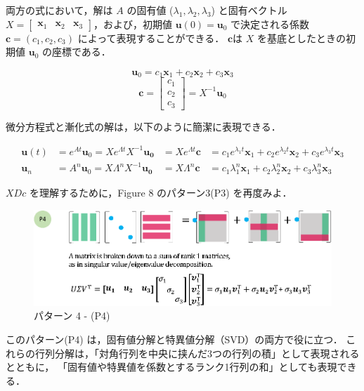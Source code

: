 \documentclass[letterpaper]{article}
\begin{document}
両方の式において，解は $A$ の固有値 ($\lambda_1, \lambda_2, \lambda_3$) と固有ベクトル
$X=\begin{bmatrix} \bm{x}_1 & \bm{x}_2 & \bm{x}_3 \end{bmatrix}$，および，初期値
$\bm{u}(0)=\bm{u}_0$ で決定される係数$\bm{c}=(c_1, c_2, c_3)$ によって表現することができる．
$\bm{c}$は $X$ を基底としたときの初期値 $\bm{u}_0$ の座標である．

\begin{equation*}
  \bm{u}_0 = c_1 \bm{x}_1 + c_2 \bm{x}_2 + c_3 \bm{x}_3
\end{equation*}
\begin{equation*}
  \bm{c} =
  \begin{bmatrix}
    c_1\\
    c_2\\
    c_3
  \end{bmatrix} = X^{-1} \bm{u}_0
\end{equation*}

微分方程式と漸化式の解は，以下のように簡潔に表現できる．

\begin{align*}
  \bm{u}(t) &= e^{At} \bm{u}_0 = X e^{\Lambda t} X^{-1} \bm{u_0} &= X e^{\Lambda t} \bm{c} &= c_1 e^{\lambda_1 t} \bm{x}_1 + c_2 e^{\lambda_2 t} \bm{x}_2 + c_3 e^{\lambda_3 t} \bm{x}_3\\
  \bm{u}_n &= A^n \bm{u}_0 = X \Lambda^n X^{-1} \bm{u_0} &= X \Lambda^n \bm{c} &= c_1 \lambda_1^n \bm{x}_1 + c_2 \lambda_2^n \bm{x}_2 + c_3 \lambda_3^n \bm{x}_3
\end{align*}

$XDc$ を理解するために，Figure 8 のパターン3(P3) を再度みよ．

\begin{figure}[H]
  \includegraphics[keepaspectratio, width=\linewidth]{Pattern4.eps}
  \caption{パターン 4 - (P4)}
\end{figure}

このパターン(P4) は，固有値分解と特異値分解（SVD）の両方で役に立つ．
これらの行列分解は，「対角行列を中央に挟んだ3つの行列の積」として表現されるとともに，
「固有値や特異値を係数とするランク1行列の和」としても表現できる．
\end{document}
